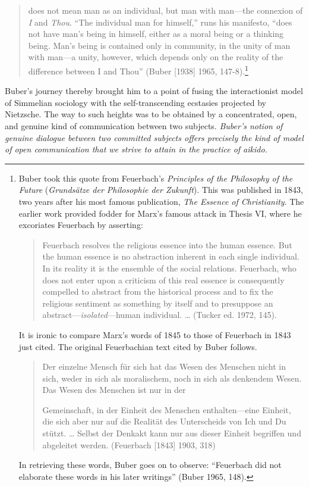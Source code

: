 \begin{quote}
does not mean man as an individual, but man with man---the connexion of \emph{I} and \emph{Thou}. ``The individual man for himself,'' runs his manifesto, ``does not have man's being in himself, either as a moral being or a thinking being. Man's being is contained only in community, in the unity of man with man---a unity, however, which depends only on the reality of the difference between I and Thou'' (Buber [1938] 1965, 147-8).\footnote{Buber took this quote from Feuerbach's \emph{Principles of the Philosophy of the Future} (\emph{Grunds\"{a}tze der Philosophie der Zukunft}). This was published in 1843, two years after his most famous publication, \emph{The Essence of Christianity}. The earlier work provided fodder for Marx's famous attack in Thesis VI, where he excoriates Feuerbach by asserting: 

\begin{quote}
Feuerbach resolves the religious essence into the human essence. But the human essence is no abstraction inherent in each single individual. In its reality it is the ensemble of the social relations. Feuerbach, who does not enter upon a criticism of this real essence is consequently compelled to abstract from the historical process and to fix the religious sentiment as something by itself and to presuppose an abstract---\emph{isolated}---human individual. \ldots{} (Tucker ed. 1972, 145).
\end{quote}

It is ironic to compare Marx's words of 1845 to those of Feuerbach in 1843 just cited. The original Feuerbachian text cited by Buber follows. 

\begin{quote}
Der einzelne Mensch f\"{u}r sich hat das Wesen des Menschen nicht in sich, weder in sich als moralischem, noch in sich als denkendem Wesen. Das Wesen des Menschen ist nur in der 

Gemeinschaft, in der Einheit des Menschen enthalten---eine Einheit, die sich aber nur auf die Realit\"{a}t des Unterscheids von Ich und Du st\"{u}tzt. \ldots{} Selbst der Denkakt kann nur aus dieser Einheit begriffen und abgeleitet werden. (Feuerbach [1843] 1903, 318)
\end{quote}

In retrieving these words, Buber goes on to observe: ``Feuerbach did not elaborate these words in his later writings'' (Buber 1965, 148).}
\end{quote}

Buber's journey thereby brought him to a point of fusing the interactionist model of Simmelian sociology with the self-transcending ecstasies projected by Nietzsche. The way to such heights was to be obtained by a concentrated, open, and genuine kind of communication between two subjects. \emph{Buber's notion of genuine dialogue between two committed subjects offers precisely the kind of model of open communication that we strive to attain in the practice of aikido.} 

